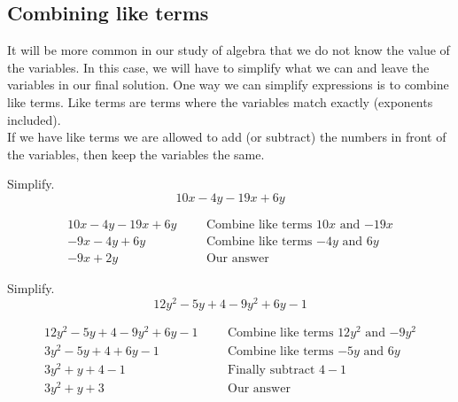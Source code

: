\subsection{Combining like terms}
It will be more common in our study of algebra that we do not know the value of the variables. In this case, we will have to simplify what we can and leave the variables in our final solution. One way we can simplify expressions is to combine like terms. Like terms are terms where the variables match exactly (exponents included).\\
If we have like terms we are allowed to add (or subtract) the numbers in
front of the variables, then keep the variables the same.
\begin{exa}
	Simplify. \[
				10x-4y-19x+6y
	\]
\end{exa}
\begin{align*}
    10x-4y-19x+6y&  &   &\text{Combine like terms $10x$ and $-19x$}\\
    -9x -4y+6y& &   &\text{Combine like terms $-4y$ and $6y$}\\
    -9x +2y&    &   &\text{Our answer}
\end{align*}
\begin{exa}
	Simplify. \[
			12y^2-5y+4-9y^2+6y-1
	\]
\end{exa}
\begin{align*}
    12y^2-5y+4-9y^2+6y-1&  &   &\text{Combine like terms $12y^2$ and $-9y^2$}\\
    3y^2-5y+4+6y-1& &   &\text{Combine like terms $-5y$ and $6y$}\\
    3y^2+y+4-1&    &   &\text{Finally subtract $4-1$}\\
     3y^2+y+3&  &   &\text{Our answer}
\end{align*}
